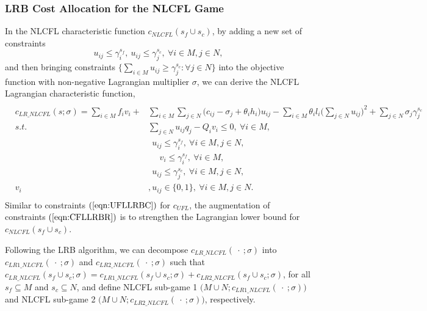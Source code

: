 \documentclass[ijoc,nonblindrev]{informs3} %
\begin{document}
\subsubsection{LRB Cost Allocation for the NLCFL Game}\label{example-decompnlcfl}
In the NLCFL characteristic function $c_{NLCFL}(s_f \cup s_c)$, by adding a new set of constraints
\begin{equation}\label{eqn:CFLLRBR}
u_{ij} \leq \gamma_i^{s_f}, ~u_{ij} \leq \gamma_j^{s_c},~\forall i \in M, j \in N,
\end{equation}
and then bringing constraints $\big\{\sum_{i \in M} u_{ij} \geq \gamma_j^{s_c}:\forall j \in N\big\}$ into the objective function with non-negative Lagrangian multiplier $\sigma$, we can derive the NLCFL Lagrangian characteristic function,
\begin{eqnarray*}\label{eqn:LRCFnonlinear}
\begin{aligned}
\begin{split}
c_{LR\_NLCFL}(s;\sigma) = \sum_{i \in M}f_iv_i + &\sum_{i \in M} \sum_{j \in N} \big(c_{ij} - \sigma_{j} + \theta_ih_i\big)u_{ij}
 - \sum_{i \in M} \theta_il_i \big( \sum_{j \in N}u_{ij}\big)^2 + \sum_{j \in N} \sigma_j \gamma_j^{s_c}\\
s.t.~&\sum_{j \in N}u_{ij}q_j - Q_iv_i \leq 0,~\forall i \in M,\\
~~~~~~&~~u_{ij} \leq \gamma_i^{s_f},~\forall i \in M, j \in N,\\
~~~&~~~~~~v_i \leq \gamma_i^{s_f},~\forall i \in M,\\
~~~~~~&~~u_{ij} \leq \gamma_j^{s_c},~\forall i \in M, j \in N,\\
v_i&, u_{ij} \in \{0,1\}, ~\forall i \in M, j \in N.
\end{split}
\end{aligned}
\end{eqnarray*}
Similar to constraints $(\ref{eqn:UFLLRBC})$ for $c_{UFL}$, the augmentation of constraints $(\ref{eqn:CFLLRBR})$ is to strengthen the Lagrangian lower bound for $c_{NLCFL}(s_f \cup s_c)$.


Following the LRB algorithm, we can decompose $c_{LR\_NLCFL}(\ \cdot\ ;\sigma)$ into $c_{LR1\_NLCFL}(\ \cdot\ ;\sigma)$ and $c_{LR2\_NLCFL}(\ \cdot\ ;\sigma)$ such that $c_{LR\_NLCFL}(s_f \cup s_c;\sigma) = c_{LR1\_NLCFL}(s_f \cup s_c;\sigma) + c_{LR2\_NLCFL}(s_f \cup s_c;\sigma)$, for all $s_f \subseteq M$ and $s_c \subseteq N$, and define NLCFL sub-game 1 $\big(M \cup N;c_{LR1\_NLCFL}(\ \cdot\ ;\sigma)\big)$ and NLCFL sub-game 2 $\big(M \cup N;c_{LR2\_NLCFL}(\ \cdot\ ;\sigma)\big)$, respectively.
\end{document}
